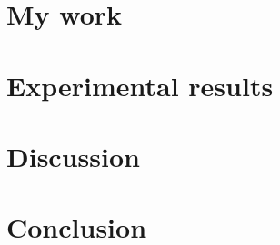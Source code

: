 \documentclass[twoside]{Style/uva-inf-bachelor-thesis}
\begin{document}
\chapter{My work}\label{chap:mywork}


\chapter{Experimental results}\label{chap:experiments}


\chapter{Discussion}\label{chap:discussion}


\chapter{Conclusion}\label{chap:conclusion}


\printbibliography
\end{document}
